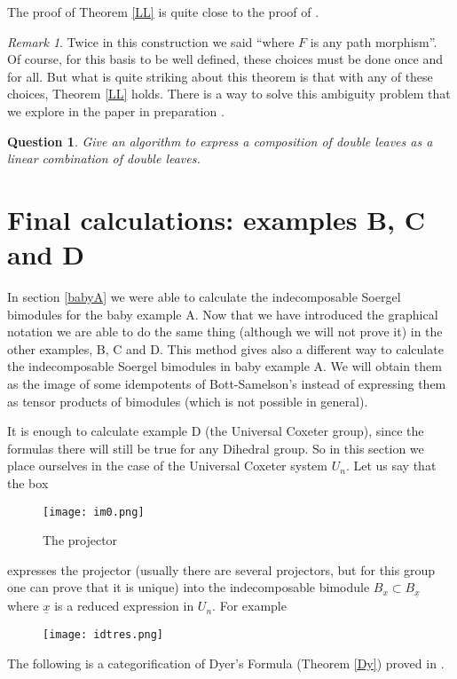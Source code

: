\documentclass[12pt]{wart}
\newtheorem{ques}[thm]{Question}
\theoremstyle{remark}
\newtheorem{remark}{Remark}
\begin{document}
 The proof  of Theorem \ref{LL} is quite close to the proof of \cite[Th\'eor\`eme 5.1]{Li1}. 

\begin{remark}
Twice in this construction we said ``where $F$ is any path morphism''. Of course, for this basis to be well defined, these choices must be done once and for all. But what is quite striking about this theorem is that with any of these choices, Theorem  \ref{LL}  holds. There is a way to solve this ambiguity problem that we explore in the paper in preparation \cite{LW}. 
\end{remark}

\begin{ques} Give an algorithm to express a composition of double leaves as a linear combination of double leaves.
\end{ques} 





\section{Final calculations: examples B, C and D}\label{final}

In section \ref{babyA} we were able to calculate the indecomposable Soergel bimodules for the baby example A. Now that we have introduced the graphical notation we are able to do the same thing (although we will not prove it) in the other examples, B, C and D. This method  gives  also a different way to calculate the indecomposable Soergel bimodules in baby example A. We will obtain them as the image of some idempotents of Bott-Samelson's instead of expressing them as tensor products of bimodules (which is not possible in general). 

It is enough to calculate example D (the Universal Coxeter group), since the formulas there will still be true for any Dihedral group. So in this section  we place ourselves in the case of the Universal Coxeter system $U_n$. Let us say that the box
 \begin{figure}[H] 
\begin{center}
 \texttt{[image: im0.png]}   
\end{center}
\caption{The projector}
\end{figure} 
expresses the projector (usually there are several projectors, but for this group one can prove that it is unique) into the indecomposable bimodule $B_x\subset B_{\underline{x}}$ where  $\underline{x}$ is a reduced expression in $U_n$.  For example 
\begin{figure}[H] 
\begin{center}
 \texttt{[image: idtres.png]} 
\end{center}
\end{figure} 
The following is a categorification of Dyer's Formula (Theorem \ref{Dy}) proved in \cite{EL}.
\end{document}
